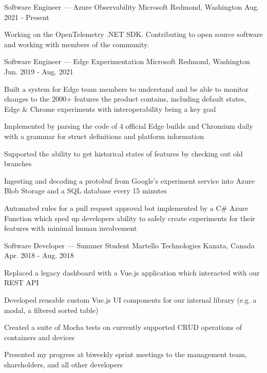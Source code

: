 
\begin{cventries}
	\cventry
		{Software Engineer --- Azure Observability}
		{Microsoft}
		{Redmond, Washington}
		{Aug. 2021 - Present}
		{\begin{cvitems}
			\item Working on the OpenTelemetry .NET SDK. Contributing to open source software and working with members of the community.
		\end{cvitems}}
		
	\cventry
		{Software Engineer --- Edge Experimentation}
		{Microsoft}
		{Redmond, Washington}
		{Jun. 2019 - Aug. 2021}
		{\begin{cvitems}
			\item Built a system for Edge team members to understand and be able to monitor changes to the 2000+ features the product contains, including default states, Edge \& Chrome experiments with interoperability being a key goal
			\item Implemented by parsing the code of 4 official Edge builds and Chromium daily with a grammar for struct definitions and platform information
			\item Supported the ability to get historical states of features by checking out old branches
			\item Ingesting and decoding a protobuf from Google's experiment service into Azure Blob Storage and a SQL database every 15 minutes
			\item Automated rules for a pull request approval bot implemented by a C\# Azure Function which sped up developers ability to safely create experiments for their features with minimal human involvement
		\end{cvitems}}

	\cventry
		{Software Developer --- Summer Student}
		{Martello Technologies}
		{Kanata, Canada}
		{Apr. 2018 - Aug. 2018}
		{\begin{cvitems}
			\item Replaced a legacy dashboard with a Vue.js application which interacted with our REST API
			\item Developed reusable custom Vue.js UI components for our internal library (e.g. a modal, a filtered sorted table)
			\item Created a suite of Mocha tests on currently supported CRUD operations of containers and devices
			\item Presented my progress at biweekly sprint meetings to the management team, shareholders, and all other developers
		\end{cvitems}}


\end{cventries}

